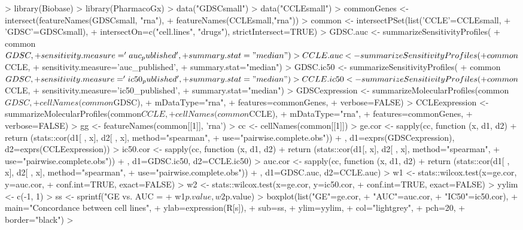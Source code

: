 \documentclass[11pt]{article}
\begin{document}
\begin{Schunk}
\begin{Sinput}
>   library(Biobase)
>   library(PharmacoGx)
>   data("GDSCsmall")
>   data("CCLEsmall")
>   commonGenes <- intersect(featureNames(GDSCsmall, "rna"),
+                            featureNames(CCLEsmall,"rna"))
>   common <- intersectPSet(list('CCLE'=CCLEsmall,
+                                'GDSC'=GDSCsmall),
+                           intersectOn=c("cell.lines", "drugs"), strictIntersect=TRUE)
>   GDSC.auc <- summarizeSensitivityProfiles(
+                 common$GDSC,
+                 sensitivity.measure='auc_published', 
+                 summary.stat="median")
>   CCLE.auc <- summarizeSensitivityProfiles(
+                 common$CCLE,
+                 sensitivity.measure='auc_published', 
+                 summary.stat="median")
>   GDSC.ic50 <- summarizeSensitivityProfiles(
+                 common$GDSC, 
+                 sensitivity.measure='ic50_published', 
+                 summary.stat="median")
>   CCLE.ic50 <- summarizeSensitivityProfiles(
+                 common$CCLE, 
+                 sensitivity.measure='ic50_published', 
+                 summary.stat="median")
>   GDSCexpression <- summarizeMolecularProfiles(common$GDSC, 
+                                         cellNames(common$GDSC),
+                                         mDataType="rna",
+                                         features=commonGenes,
+                                         verbose=FALSE)
>   CCLEexpression <- summarizeMolecularProfiles(common$CCLE, 
+                                          cellNames(common$CCLE),
+                                          mDataType="rna",
+                                          features=commonGenes,
+                                          verbose=FALSE)
>   gg <- featureNames(common[[1]], 'rna')
>   cc <- cellNames(common[[1]])
>   ge.cor <- sapply(cc, function (x, d1, d2) {
+     return (stats::cor(d1[ , x], d2[ , x], method="spearman",
+                 use="pairwise.complete.obs"))
+   }, d1=exprs(GDSCexpression), d2=exprs(CCLEexpression))
>   ic50.cor <- sapply(cc, function (x, d1, d2) {
+     return (stats::cor(d1[, x], d2[ , x], method="spearman",
+                 use="pairwise.complete.obs"))
+   }, d1=GDSC.ic50, d2=CCLE.ic50)
>   auc.cor <- sapply(cc, function (x, d1, d2) {
+     return (stats::cor(d1[ , x], d2[ , x], method="spearman",
+                 use="pairwise.complete.obs"))
+   }, d1=GDSC.auc, d2=CCLE.auc)
>   w1 <- stats::wilcox.test(x=ge.cor, y=auc.cor,
+                            conf.int=TRUE, exact=FALSE)
>   w2 <- stats::wilcox.test(x=ge.cor, y=ic50.cor,
+                            conf.int=TRUE, exact=FALSE)
>   yylim <- c(-1, 1)
>   ss <- sprintf("GE vs. AUC = %
+                 w1$p.value, w2$p.value)
>   boxplot(list("GE"=ge.cor,
+                "AUC"=auc.cor,
+                "IC50"=ic50.cor),
+           main="Concordance between cell lines",
+           ylab=expression(R[s]),
+           sub=ss,
+           ylim=yylim,
+           col="lightgrey",
+           pch=20,
+           border="black")
> 
\end{Sinput}
\end{Schunk}
\end{document}
